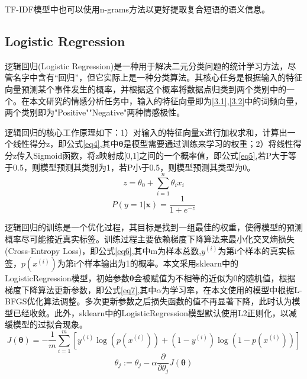 \documentclass{article}
\begin{document}
TF-IDF模型中也可以使用n-grams方法以更好提取复合短语的语义信息。

\subsection{Logistic Regression}
逻辑回归(Logistic Regression)是一种用于解决二元分类问题的统计学习方法，尽管名字中含有“回归”，但它实际上是一种分类算法。其核心任务是根据输入的特征向量预测某个事件发生的概率，并根据这个概率将数据点归类到两个类别中的一个。在本文研究的情感分析任务中，输入的特征向量即为\ref{3.1},\ref{3.2}中的词频向量，两个类别即为"Positive""Negative"两种情感极性。

逻辑回归的核心工作原理如下：1）对输入的特征向量\textbf{x}进行加权求和，计算出一个线性得分z，即公式\eqref{eq4},其中$\boldsymbol{\theta}$是模型需要通过训练来学习的权重；2）将线性得分z传入Sigmoid函数，将z映射成[0,1]之间的一个概率值，即公式\eqref{eq5},若P大于等于0.5，则模型预测其类别为1，若P小于0.5，则模型预测其类型为0。
\begin{equation}
    z=\theta_0+\sum_{i=1}^n\theta_ix_i \label{eq4}
\end{equation}
\begin{equation}
    P(y=1|\textbf{x})=\frac{1}{1+e^{-z}} \label{eq5}
\end{equation}

逻辑回归的训练是一个优化过程，其目标是找到一组最佳的权重，使得模型的预测概率尽可能接近真实标签。训练过程主要依赖梯度下降算法来最小化交叉熵损失(Cross-Entropy Loss)，即公式\eqref{eq6},其中m为样本总数,$y^{(i)}$为第i个样本的真实标签，$p(x^{(i)})$为第i个样本输出为1的概率。本文采用sklearn中的LogisticRegression模型，初始参数$\boldsymbol{\theta}$会被赋值为不相等的近似为0的随机值，根据梯度下降算法更新参数，即公式\eqref{eq7},其中$\alpha$为学习率，在本文使用的模型中根据L-BFGS优化算法调整。多次更新参数之后损失函数的值不再显著下降，此时认为模型已经收敛。此外，sklearn中的LogisticRegression模型默认使用L2正则化，以减缓模型的过拟合现象。
\begin{equation}
    J(\boldsymbol{\theta})=-\frac{1}{m}\sum_{i=1}^m[y^{(i)}\log(p(x^{(i)}))+(1-y^{(i)})\log(1-p(x^{(i)}))] \label{eq6}
\end{equation}
\begin{equation}
    \theta_j:=\theta_j-\alpha\frac{\partial}{\partial\theta_j}J(\boldsymbol{\theta}) \label{eq7}
\end{equation}
\end{document}
